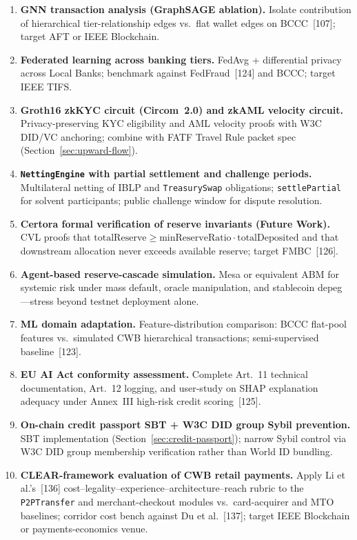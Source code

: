 \documentclass[12pt,a4paper]{report}
\begin{document}
\begin{enumerate}[noitemsep]
\item \textbf{GNN transaction analysis (GraphSAGE ablation).}\label{sec:gnn-extension}
Isolate contribution of hierarchical tier-relationship edges vs.\ flat wallet edges on BCCC~[107]; target AFT or IEEE Blockchain.
\item \textbf{Federated learning across banking tiers.}\label{sec:fl-fraud}
FedAvg + differential privacy across Local Banks; benchmark against FedFraud~[124] and BCCC; target IEEE TIFS.
\item \textbf{Groth16 zkKYC circuit (Circom~2.0) and zkAML velocity circuit.}
Privacy-preserving KYC eligibility and AML velocity proofs with W3C DID/VC anchoring; combine with FATF Travel Rule packet spec (Section~\ref{sec:upward-flow}).
\item \textbf{\texttt{NettingEngine} with partial settlement and challenge periods.}
Multilateral netting of IBLP and \texttt{TreasurySwap} obligations; \texttt{settlePartial} for solvent participants; public challenge window for dispute resolution.
\item \textbf{Certora formal verification of reserve invariants (Future Work).}\label{sec:certora}
CVL proofs that \(\mathrm{totalReserve} \ge \mathrm{minReserveRatio} \cdot \mathrm{totalDeposited}\) and that downstream allocation never exceeds available reserve; target FMBC~[126].
\item \textbf{Agent-based reserve-cascade simulation.} Mesa or equivalent ABM for systemic risk under mass default, oracle manipulation, and stablecoin depeg---stress beyond testnet deployment alone.
\item \textbf{ML domain adaptation.} Feature-distribution comparison: BCCC flat-pool features vs.\ simulated CWB hierarchical transactions; semi-supervised baseline~[123].
\item \textbf{EU AI Act conformity assessment.} Complete Art.~11 technical documentation, Art.~12 logging, and user-study on SHAP explanation adequacy under Annex~III high-risk credit scoring~[125].
\item \textbf{On-chain credit passport SBT + W3C DID group Sybil prevention.} SBT implementation (Section~\ref{sec:credit-passport}); narrow Sybil control via W3C DID group membership verification rather than World ID bundling.
\item \textbf{CLEAR-framework evaluation of CWB retail payments.} Apply Li et al.'s~[136] cost--legality--experience--architecture--reach rubric to the \texttt{P2PTransfer} and merchant-checkout modules vs.\ card-acquirer and MTO baselines; corridor cost bench against Du et al.~[137]; target IEEE Blockchain or payments-economics venue.
\end{enumerate}
\end{document}

